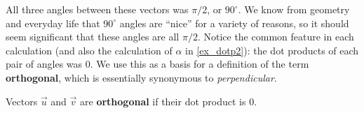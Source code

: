 All three angles between these vectors was $\pi/2$, or $90^\circ$. We know from geometry and everyday life that $90^\circ$ angles are ``nice'' for a variety of reasons, so it should seem significant that these angles are all $\pi/2$. Notice the common feature in each calculation (and also the calculation of $\alpha$ in \autoref{ex_dotp2}): the dot products of each pair of angles was 0. We use this as a basis for a definition of the term \textbf{orthogonal}, which is essentially synonymous to \textit{perpendicular}.

\begin{definition}[Orthogonal]\label{def:orthogonal}
Vectors $\vec u$ and $\vec v$ are \textbf{orthogonal} if their dot product is 0.
\end{definition}


